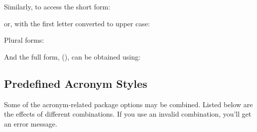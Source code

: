\documentclass{nlctdoc}
\begin{document}
Similarly, to access the short form:
\begin{definition}[\DescribeMacro{\glsentryshort}]
\end{definition}
or, with the first letter converted to upper case:
\begin{definition}[\DescribeMacro{\Glsentryshort}]
\end{definition}
Plural forms:
\begin{definition}[\DescribeMacro{\glsentryshortpl}]
\end{definition}
\begin{definition}[\DescribeMacro{\Glsentryshortpl}]
\end{definition}

And the full form,  (), can be obtained
using:
\begin{definition}[\DescribeMacro{\glsentryfull}]
\end{definition}
\begin{definition}[\DescribeMacro{\Glsentryfull}]
\end{definition}
\begin{definition}[\DescribeMacro{\glsentryfullpl}]
\end{definition}
\begin{definition}[\DescribeMacro{\Glsentryfullpl}]
\end{definition}

\subsection{Predefined Acronym Styles}

Some of the acronym-related package options may be combined. Listed
below are the effects of different combinations. If you use an
invalid combination, you'll get an error message.
\end{document}
